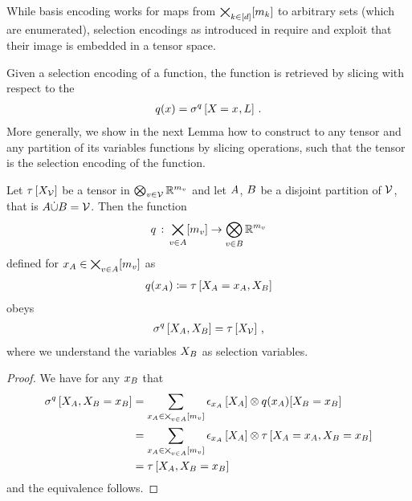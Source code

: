 While basis encoding works for maps from $\bigtimes_{k\in[d]}[m_{k}]$ to arbitrary sets (which are enumerated), selection encodings as introduced in  require and exploit that their image is embedded in a tensor space.

Given a selection encoding of a function, the function is retrieved by slicing with respect to the
\begin{align*}
    q(x) = \sigma^{q}\left[X_{}=x_{},L\right] \, .
\end{align*}
More generally, we show in the next Lemma how to construct to any tensor and any partition of its variables functions by slicing operations, such that the tensor is the selection encoding of the function.

\begin{theorem}
    \label{the:inverseSelectionEncoding} %
    Let $\tau\left[X_{\mathcal{V}}\right]$ be a tensor in $\bigotimes_{v\in\mathcal{V}}\mathbb{R}^{m_{v}}$ and let $A$, $B$ be a disjoint partition of $\mathcal{V}$, that is $A\dot{\cup}B=\mathcal{V}$.
    Then the function
    \begin{align*}
        q\,:\, \bigtimes_{v\in A}[m_{v}] \rightarrow \bigotimes_{v\in B} \mathbb{R}^{m_{v}}
    \end{align*}
    defined for $x_{A}\in\bigtimes_{v\in A}[m_{v}]$ as
    \begin{align*}
        q(x_{A}) \coloneqq \tau\left[X_{A}=x_{A},X_{B}\right]
    \end{align*}
    obeys
    \begin{align*}
        \sigma^{q}\left[X_{A},X_{B}\right] = \tau\left[X_{\mathcal{V}}\right] \, ,
    \end{align*}
    where we understand the variables $X_{B}$ as selection variables.
\end{theorem}
\begin{proof}
    We have for any $x_{B}$ that
    \begin{align*}
        \sigma^{q}\left[X_{A},X_{B}=x_{B}\right]
        &= \sum_{x_{A}\in\bigtimes_{v\in A}[m_{v}]} \epsilon_{x_{A}}\left[X_{A}\right]
        \otimes q(x_{A})[X_{B}=x_{B}] \\
        &= \sum_{x_{A}\in\bigtimes_{v\in A}[m_{v}]} \epsilon_{x_{A}}\left[X_{A}\right]
        \otimes \tau\left[X_{A}=x_{A},X_{B}=x_{B}\right] \\
        &= \tau\left[X_{A},X_{B}=x_{B}\right]
    \end{align*}
    and the equivalence follows.
\end{proof}


